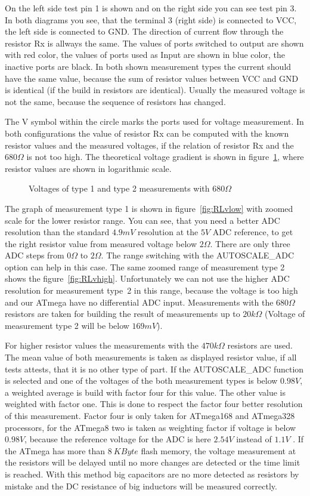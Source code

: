 On the left side test pin 1 is shown and on the right side you can see test pin 3.
In both diagrams you see, that the terminal 3 (right side) is connected to VCC, the left side is
connected to GND. The direction of current flow through the resistor Rx is allways the same. 
The values of ports switched to output are shown with red color, the values of 
ports used as Input are shown in blue color, the inactive ports are black.
In both shown measurement types the current should have the same value, because the sum of resistor values
between VCC and GND is identical (if the build in resistors are identical).
Usually the measured voltage is not the same, because the sequence
of resistors has changed.

The V symbol within the circle marks the ports used for voltage measurement.
In both configurations the value of resistor Rx can be computed with the known
resistor values and the measured voltages, if the relation of resistor Rx and the \(680\Omega\) is not too high.
The theoretical voltage gradient is shown in figure~\ref{fig:RLvtot}, where resistor values are shown in logarithmic scale.
\begin{figure}[H]
\centering

\caption{Voltages of type 1 and type 2 measurements with \(680\Omega\) }
\label{fig:RLvtot}
\end{figure}
The graph of measurement type 1 is shown in figure~\ref{fig:RLvlow} with zoomed scale for the lower resistor range.
You can see, that you need a better ADC resolution than the standard \(4.9mV\) resolution at the \(5V\) ADC reference, to get
the right resistor value from measured voltage below \(2\Omega\).
There are only three ADC steps from \(0\Omega\) to \(2\Omega\).
The range switching with the AUTOSCALE\_ADC option can help in this case.
The same zoomed range of measurement type 2 shows the figure~\ref{fig:RLvhigh}.
Unfortunately we can not use the higher ADC resolution for measurement type~2 in this range,
 because the voltage is too high and our ATmega have no differential ADC input.
Measurements with the \(680\Omega\) resistors are taken for building the result of measurements up to \(20k\Omega\)
(Voltage of measurement type 2 will be below \(169mV\)).

For higher resistor values the measurements with the \(470k\Omega\) resistors are used. The mean value of both
measurements is taken as displayed resistor value, if all tests attests, that it is no other type of part.
If the AUTOSCALE\_ADC function is selected and one of the voltages of the both measurement types is below \(0.98V\),
a weighted average is build with factor four for this value. The other value is weighted with factor one.
This is done to respect the factor four better resolution of this measurement. Factor four is only taken for 
ATmega168 and ATmega328 processors, for the ATmega8 two is taken as weighting factor if voltage is below \(0.98V\),
because the reference voltage for the ADC is here \(2.54V\) instead of \(1.1V\) .
If the ATmega has more than \(8~KByte\) flash memory, the voltage measurement at the resistors will be delayed until
no more changes are detected or the time limit is reached.
With this method big capacitors are no more detected as resistors by mistake and
the DC resistance of big inductors will be measured correctly.



